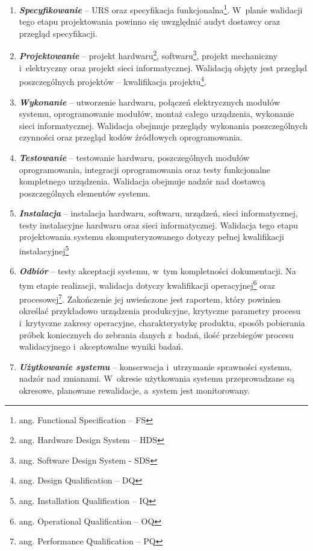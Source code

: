 \documentclass{xmgr}
\begin{document}
\begin{enumerate}
  \item \textbf{\textit{Specyfikowanie}} -- URS oraz specyfikacja funkcjonalna\footnote{ang. Functional Specification -- FS}. W~planie walidacji tego etapu projektowania powinno się uwzględnić audyt dostawcy oraz przegląd specyfikacji.
  \item \textbf{\textit{Projektowanie}} -- projekt hardwaru\footnote{ang. Hardware Design System -- HDS}, softwaru\footnote{ang. Software Design System - SDS}, projekt mechaniczny i~elektryczny oraz projekt sieci informatycznej. Walidacją objęty jest przegląd poszczególnych projektów – kwalifikacja projektu\footnote{ang. Design Qualification -- DQ}.
  \item \textbf{\textit{Wykonanie}} -- utworzenie hardwaru, połączeń elektrycznych modułów systemu, oprogramowanie modułów, montaż całego urządzenia, wykonanie sieci informatycznej. Walidacja obejmuje przeglądy wykonania poszczególnych czynności oraz przegląd kodów źródłowych oprogramowania.
\item \textbf{\textit{Testowanie}} -- testowanie hardwaru, poszczególnych modułów oprogramowania,  integracji oprogramowania oraz testy funkcjonalne kompletnego urządzenia. Walidacja obejmuje nadzór nad dostawcą poszczególnych elementów systemu.
\item \textbf{\textit{Instalacja}} -- instalacja hardwaru, softwaru, urządzeń, sieci informatycznej, testy instalacyjne hardwaru oraz sieci informatycznej. Walidacja tego etapu projektowania systemu skomputeryzowanego dotyczy pełnej kwalifikacji instalacyjnej\footnote{ang. Installation Qualification -- IQ}
\item \textbf{\textit{Odbiór}} – testy akceptacji systemu, w~tym kompletności dokumentacji. Na tym etapie realizacji, walidacja dotyczy kwalifikacji operacyjnej\footnote{ang. Operational Qualification -- OQ} oraz procesowej\footnote{ang. Performance Qualification -- PQ}. Zakończenie jej uwieńczone jest raportem, który powinien określać przykładowo urządzenia produkcyjne, krytyczne parametry procesu i~krytyczne zakresy operacyjne, charakterystykę produktu, sposób pobierania próbek koniecznych do zebrania danych z~badań, ilość przebiegów procesu walidacyjnego i~akceptowalne wyniki badań.
\item \textbf{\textit{Użytkowanie systemu}} – konserwacja i~utrzymanie sprawności systemu, nadzór nad zmianami. W~okresie użytkowania systemu przeprowadzane są okresowe, planowane rewalidacje, a~system jest monitorowany.\cite{LAB-EL2}
\end{enumerate}
\end{document}
